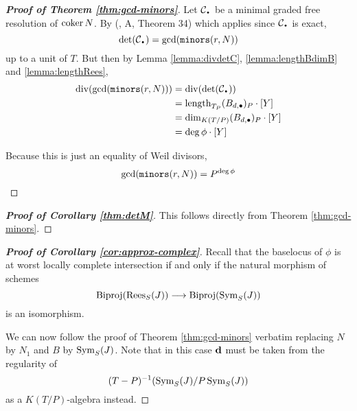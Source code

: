 \documentclass[fleqn,reqno]{amsart}
\numberwithin{first}{chapter}
\begin{document}
\begin{proof}[\bf Proof of Theorem \ref{thm:gcd-minors}]
Let $\mathcal{C}_\nbul$ be a minimal graded free resolution of $\operatorname{coker} N$.
By (\citet{GKZ94}, A, Theorem 34) which applies since $\mathcal{C}_\nbul$ is exact,
\[
	\det(\mathcal{C}_\nbul)=\gcd(\mt{minors}(r,N))
\]
up to a unit of $T$. But then by Lemma \ref{lemma:divdetC}, \ref{lemma:lengthBdimB} and \ref{lemma:lengthRees},
\begin{align*}
\thediv(\gcd(\mt{minors}(r,N)))&=\thediv(\det(\mathcal{C}_\nbul))\\
&=\length_{T_P} (B_{d,\bullet})_P\cdot[Y]\\
&=\dim_{K(T/P)} (B_{d,\bullet})_P\cdot[Y]\\
&=\deg\phi\cdot[Y]
\end{align*}

Because this is just an equality of Weil divisors,
\[
\gcd(\mathop{\tt minors}(r,N))=P^{\deg\phi}\qedhere
\]
\end{proof}

\begin{proof}[\bf Proof of Corollary \ref{thm:detM}]
This follows directly from Theorem \ref{thm:gcd-minors}.
\end{proof}

\begin{proof}[\bf Proof of Corollary \ref{cor:approx-complex}]
Recall that the baselocus of $\phi$ is at worst locally complete intersection if and only if
the natural morphism of schemes
\[
\operatorname{Biproj}(\operatorname{Rees}_S(J))\longrightarrow\operatorname{Biproj}(\operatorname{Sym}_S(J))
\]
is an isomorphism.

We can now follow the proof of Theorem \ref{thm:gcd-minors} verbatim replacing
$N$ by $N_1$ and $B$ by $\operatorname{Sym}_S(J)$. Note that in this case $\mathbf d$ must be taken
from the regularity of
\[
(T-P)^{-1}(\operatorname{Sym}_S(J)/P\operatorname{Sym}_S(J))
\]
as a $K(T/P)$-algebra instead.
\end{proof}
\end{document}
